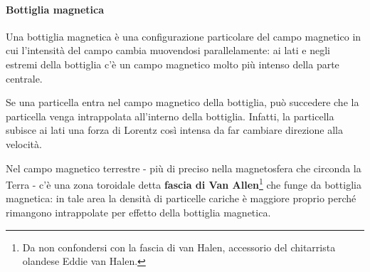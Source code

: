 \paragraph{Bottiglia magnetica}
\begin{define}
	Una bottiglia magnetica è una configurazione particolare del campo magnetico in cui l'intensità del campo cambia muovendosi parallelamente: ai lati e negli estremi della bottiglia c'è un campo magnetico molto più intenso della parte centrale.
\end{define}
Se una particella entra nel campo magnetico della bottiglia, può succedere che la particella venga intrappolata all'interno della bottiglia. Infatti, la particella subisce ai lati una forza di Lorentz così intensa da far cambiare direzione alla velocità.
\begin{example}
	Nel campo magnetico terrestre - più di preciso nella magnetosfera che circonda la Terra - c'è una zona toroidale detta \textbf{fascia di Van Allen}\footnote{Da non confondersi con la fascia di van Halen, accessorio del chitarrista olandese Eddie van Halen.} che funge da bottiglia magnetica: in tale area la densità di particelle cariche è maggiore proprio perché rimangono intrappolate per effetto della bottiglia magnetica.
\end{example}
